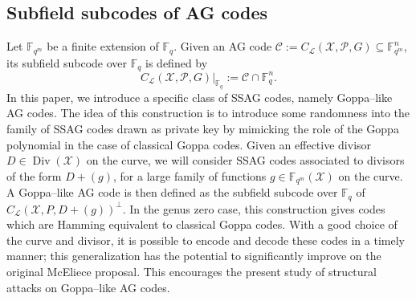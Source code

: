 \documentclass[a4paper]{amsart}
\theoremstyle{definition}
\theoremstyle{remark}
\newcommand{\calP}{\mathcal{P}}
\newcommand{\calL}{\mathcal{L}}
\newcommand{\calC}{\mathcal{C}}
\newcommand{\calX}{\mathcal{X}}
\newcommand{\fqm}{\mathbb{F}_{q^m}}
\newcommand{\fq}{\mathbb{F}_{q}}
\newcommand{\Div}{\operatorname{Div}}
\begin{document}
\subsection*{Subfield subcodes of AG codes}
Let $\fqm$ be a finite extension of $\fq$. Given an AG code $\calC :=C_{\calL}(\calX,\calP,G) \subseteq \fqm^n$, its subfield subcode over $\fq$ is defined by 
$$C_{\calL}(\calX,\calP,G)|_{\fq} := \calC \cap \fq^n.$$  
In this paper, we introduce a specific class of SSAG codes, namely Goppa--like AG codes. The idea of this construction is to introduce  some randomness into the family of SSAG codes drawn as private key by mimicking the role of the Goppa polynomial in the case of classical Goppa codes. Given an effective divisor $D\in \Div(\calX)$ on the curve, we will consider SSAG codes associated to divisors of the form $D+(g)$, for a large family of functions $g \in \fqm(\calX)$ on the curve. A Goppa--like AG code is then defined as the subfield subcode over $\fq$ of $C_{\calL}(\calX,P,D+(g))^{\perp}$. In the genus zero case, this construction gives codes which are Hamming equivalent to classical Goppa codes. With a good choice of the curve and divisor, it is possible to encode and decode these codes in a timely manner; this generalization has the potential to significantly improve on the original McEliece proposal. This encourages the present study of structural attacks on Goppa--like AG codes. 
\end{document}
